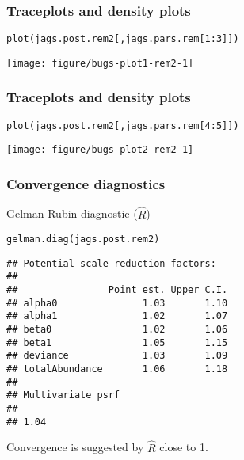 \documentclass[color=usenames,dvipsnames]{beamer}\usepackage[]{graphicx}\usepackage[]{xcolor}
\makeatletter
\newcommand{\hlnum}[1]{\textcolor[rgb]{0.69,0.494,0}{#1}}%
\newcommand{\hlopt}[1]{\textcolor[rgb]{0,0,0}{#1}}%
\newcommand{\hldef}[1]{\textcolor[rgb]{0,0,0}{#1}}%
\newcommand{\hlkwd}[1]{\textcolor[rgb]{0.004,0.004,0.506}{#1}}%
\newenvironment{kframe}{%
 \def\at@end@of@kframe{}%
 \ifinner\ifhmode%
  \def\at@end@of@kframe{\end{minipage}}%
  \begin{minipage}{\columnwidth}%
 \fi\fi%
 \def\FrameCommand##1{\hskip\@totalleftmargin \hskip-\fboxsep
 \colorbox{shadecolor}{##1}\hskip-\fboxsep
     \hskip-\linewidth \hskip-\@totalleftmargin \hskip\columnwidth}%
 \MakeFramed {\advance\hsize-\width
   \@totalleftmargin\z@ \linewidth\hsize
   \@setminipage}}%
 {\par\unskip\endMakeFramed%
 \at@end@of@kframe}
\newenvironment{knitrout}{}{} %
\makeatother
\begin{document}
\begin{frame}[fragile]
  \frametitle{Traceplots and density plots}
\begin{knitrout}\footnotesize
{}\color{fgcolor}\begin{kframe}
\begin{alltt}
\hlkwd{plot}\hldef{(jags.post.rem2[,jags.pars.rem[}\hlnum{1}\hlopt{:}\hlnum{3}\hldef{]])}
\end{alltt}
\end{kframe}

{\centering \texttt{[image: figure/bugs-plot1-rem2-1]} 

}


\end{knitrout}
\end{frame}



\begin{frame}[fragile]
  \frametitle{Traceplots and density plots}
\begin{knitrout}\footnotesize
{}\color{fgcolor}\begin{kframe}
\begin{alltt}
\hlkwd{plot}\hldef{(jags.post.rem2[,jags.pars.rem[}\hlnum{4}\hlopt{:}\hlnum{5}\hldef{]])}
\end{alltt}
\end{kframe}

{\centering \texttt{[image: figure/bugs-plot2-rem2-1]} 

}


\end{knitrout}
\end{frame}



\begin{frame}[fragile]
  \frametitle{Convergence diagnostics}
  Gelman-Rubin diagnostic ($\hat{R}$)
\begin{knitrout}\footnotesize
{}\color{fgcolor}\begin{kframe}
\begin{alltt}
\hlkwd{gelman.diag}\hldef{(jags.post.rem2)}
\end{alltt}
\begin{verbatim}
## Potential scale reduction factors:
## 
##                Point est. Upper C.I.
## alpha0               1.03       1.10
## alpha1               1.02       1.07
## beta0                1.02       1.06
## beta1                1.05       1.15
## deviance             1.03       1.09
## totalAbundance       1.06       1.18
## 
## Multivariate psrf
## 
## 1.04
\end{verbatim}
\end{kframe}
\end{knitrout}
  Convergence is suggested by $\hat{R}$ close to 1. 
\end{frame}
\end{document}
